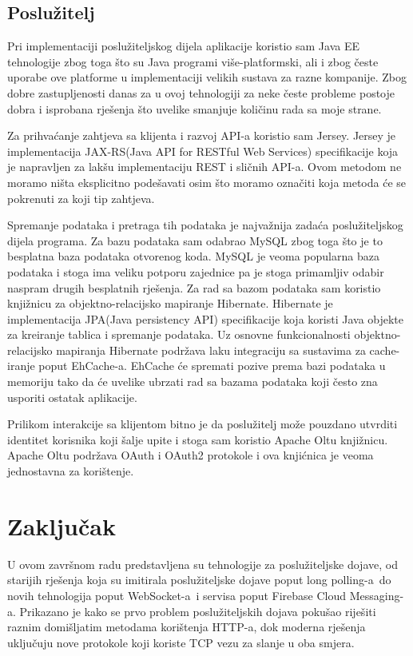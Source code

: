 \documentclass[times, utf8, zavrsni]{fer}
\begin{document}
\section{Poslužitelj}

Pri implementaciji poslužiteljskog dijela aplikacije koristio sam Java EE tehnologije zbog toga što su Java programi više-platformski, ali i zbog česte uporabe ove platforme u implementaciji velikih sustava za razne kompanije. Zbog dobre zastupljenosti danas za u ovoj tehnologiji za neke česte probleme postoje dobra i isprobana rješenja što uvelike smanjuje količinu rada sa moje strane.

Za prihvaćanje zahtjeva sa klijenta i razvoj API-a koristio sam Jersey. Jersey je implementacija JAX-RS(Java API for RESTful Web Services) specifikacije koja je napravljen za lakšu implementaciju REST i sličnih API-a. Ovom metodom ne moramo ništa eksplicitno podešavati osim što moramo označiti koja metoda će se pokrenuti za koji tip zahtjeva.

Spremanje podataka i pretraga tih podataka je najvažnija zadaća poslužiteljskog dijela programa. Za bazu podataka sam odabrao MySQL zbog toga što je to besplatna baza podataka otvorenog koda. MySQL je veoma popularna baza podataka i stoga ima veliku potporu zajednice pa je stoga primamljiv odabir naspram drugih besplatnih rješenja. Za rad sa bazom podataka sam koristio knjižnicu za objektno-relacijsko mapiranje Hibernate. Hibernate je implementacija JPA(Java persistency API) specifikacije koja koristi Java objekte za kreiranje tablica i spremanje podataka. Uz osnovne funkcionalnosti objektno-relacijsko mapiranja Hibernate podržava laku integraciju sa sustavima za cache-iranje poput EhCache-a. EhCache će spremati pozive prema bazi podataka u memoriju tako da će uvelike ubrzati rad sa bazama podataka koji često zna usporiti ostatak aplikacije.

Prilikom interakcije sa klijentom bitno je da poslužitelj može pouzdano utvrditi identitet korisnika koji šalje upite i stoga sam koristio Apache Oltu knjižnicu. Apache Oltu podržava OAuth i OAuth2 protokole i ova knjićnica je veoma jednostavna za korištenje.

\chapter{Zaključak}

U ovom završnom radu predstavljena su tehnologije za poslužiteljske dojave, od starijih rješenja koja su imitirala poslužiteljske dojave poput \glqq long polling-a\grqq\  do novih tehnologija poput \glqq WebSocket-a\grqq\  i servisa poput \glqq Firebase Cloud Messaging-a\grqq . Prikazano je kako se prvo problem poslužiteljskih dojava pokušao riješiti raznim domišljatim metodama korištenja HTTP-a, dok moderna rješenja uključuju nove protokole koji koriste TCP vezu za slanje u oba smjera.
\end{document}
